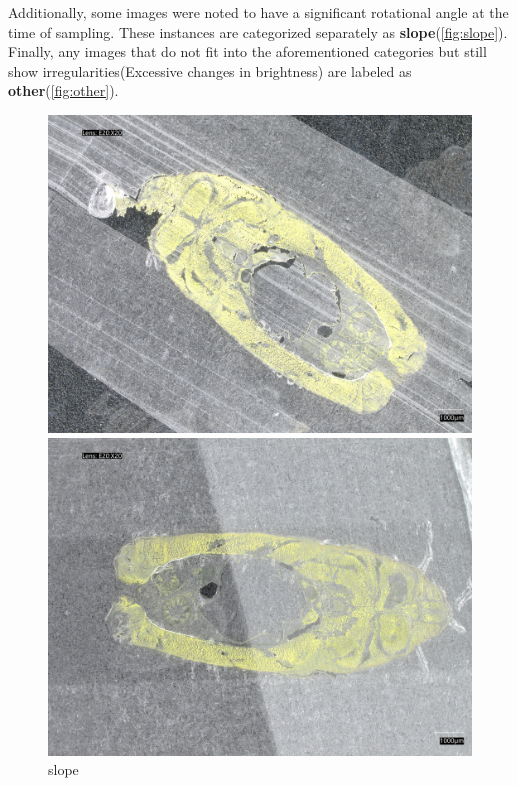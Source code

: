 Additionally, some images were noted to have a significant rotational angle at the time of sampling. These instances are categorized separately as \textbf{slope}(\autoref{fig:slope}). Finally, any images that do not fit into the aforementioned categories but still show irregularities(Excessive changes in brightness) are labeled as \textbf{other}(\autoref{fig:other}). 

\begin{figure}[H]
    \centering
    \begin{minipage}{0.32\textwidth}
        \centering
        \includegraphics[width=\textwidth]{./fig/sample_1/slope.jpg}
        \caption{slope}
        \label{fig:slope}
    \end{minipage}
    \begin{minipage}{0.32\textwidth}
        \centering
        \includegraphics[width=\textwidth]{./fig/sample_1/other.jpg}

\end{minipage}
\end{figure}
